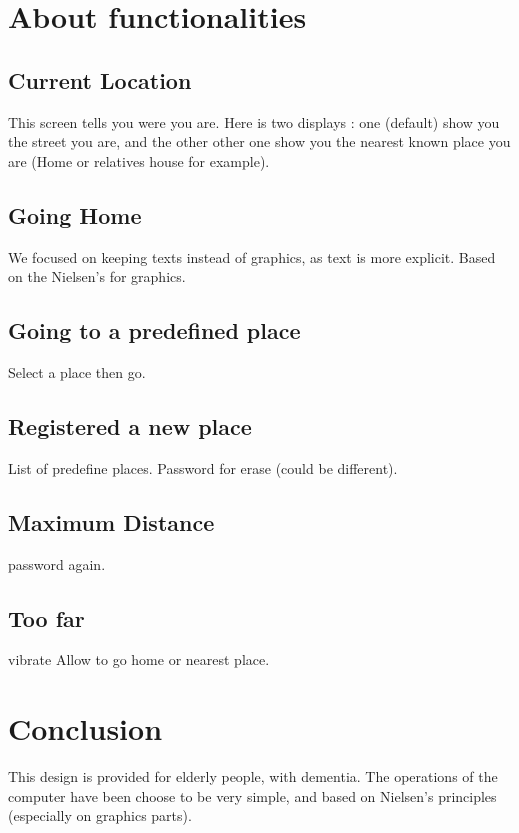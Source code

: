 \documentclass[a4paper,12pt]{article} %
\begin{document}
\section{About functionalities}
\subsection{Current Location}
This screen tells you were you are. Here is two displays : one (default) show you the street you are, and the other other one show you the nearest known place you are (Home or relatives house for example). 
\subsection{Going Home}
We focused on keeping texts instead of graphics, as text is more explicit. Based on the Nielsen's for graphics.
\subsection{Going to a predefined place}
Select a place then go.
\subsection{Registered a new place}
List of predefine places. 
Password for erase (could be different).
\subsection{Maximum Distance}
password again.
\subsection{Too far}
vibrate
Allow to go home or nearest place.
\section*{Conclusion}
This design is provided for elderly people, with dementia. The operations of the computer have been choose to be very simple, and based on Nielsen's principles (especially on graphics parts). 
\end{document}
